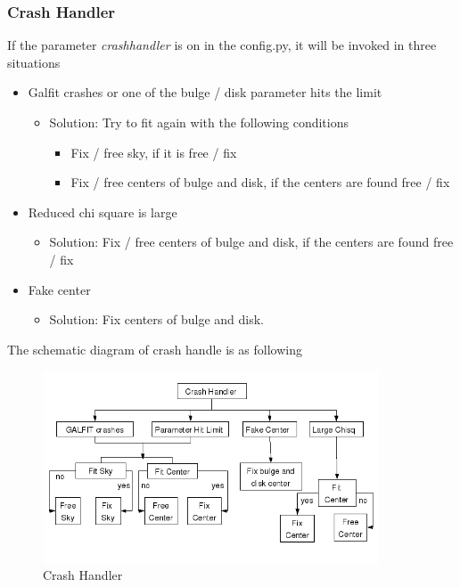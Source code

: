 \documentclass[a4paper,12pt]{article}
\begin{document}
\subsubsection{Crash Handler}
\label{crash}
If the parameter \textit{crashhandler} is on in the config.py, it will be invoked in three situations
\begin{itemize}
\item Galfit crashes or one of the bulge / disk parameter hits the limit
\begin{itemize}
\item[] Solution: Try to fit again with the following conditions
\begin{itemize}
\item Fix / free sky, if it is free / fix
\item Fix / free centers of bulge and disk, if the centers are found free / fix
\end{itemize}
\end{itemize}

\item Reduced chi square is large
\begin{itemize}
\item[] Solution: Fix / free centers of bulge and disk, if the centers are found free / fix
\end{itemize}

\item Fake center
\begin{itemize}
\item[] Solution: Fix centers of bulge and disk.
\end{itemize}
\end{itemize}
The schematic diagram of crash handle is as following
\begin{figure}
 \centering
 \includegraphics[width=10cm, height=5.7cm, bb=0 0 635 363]{pipeline-arch5.png}
 \caption{Crash Handler}
 \label{fig:arch5}
\end{figure}
\end{document}
